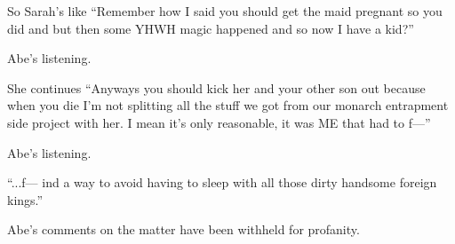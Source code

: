 {
}
{
}
{
	So Sarah's like ``Remember how I said you should get the maid pregnant so you did and but then some YHWH magic happened and so now I have a kid?''

	Abe's listening.

	She continues ``Anyways you should kick her and your other son out because when you die I'm not splitting all the stuff we got from our monarch entrapment side project with her. I mean it's only reasonable, it was ME that had to f---''

	Abe's listening.

	``...f--- ind a way to avoid having to sleep with all those dirty handsome foreign kings.''
}

{
}
{
}
{
	Abe's comments on the matter have been withheld for profanity.

}

